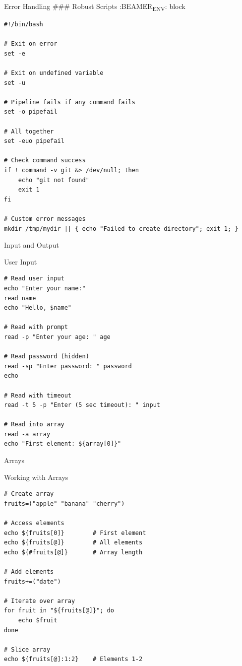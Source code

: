 \documentclass[presentation,aspectratio=1610]{beamer}
\begin{document}
\begin{frame}[label={sec:org83c1358},fragile]{Error Handling}
 \#\#\# Robust Scripts
:BEAMER\textsubscript{ENV}: block

\begin{verbatim}
#!/bin/bash

# Exit on error
set -e

# Exit on undefined variable
set -u

# Pipeline fails if any command fails
set -o pipefail

# All together
set -euo pipefail

# Check command success
if ! command -v git &> /dev/null; then
    echo "git not found"
    exit 1
fi

# Custom error messages
mkdir /tmp/mydir || { echo "Failed to create directory"; exit 1; }
\end{verbatim}
\end{frame}
\begin{frame}[label={sec:orgd1e7cc3},fragile]{Input and Output}
 \begin{block}{User Input}
\begin{verbatim}
# Read user input
echo "Enter your name:"
read name
echo "Hello, $name"

# Read with prompt
read -p "Enter your age: " age

# Read password (hidden)
read -sp "Enter password: " password
echo

# Read with timeout
read -t 5 -p "Enter (5 sec timeout): " input

# Read into array
read -a array
echo "First element: ${array[0]}"
\end{verbatim}
\end{block}
\end{frame}
\begin{frame}[label={sec:org3fc708f},fragile]{Arrays}
 \begin{block}{Working with Arrays}
\begin{verbatim}
# Create array
fruits=("apple" "banana" "cherry")

# Access elements
echo ${fruits[0]}        # First element
echo ${fruits[@]}        # All elements
echo ${#fruits[@]}       # Array length

# Add elements
fruits+=("date")

# Iterate over array
for fruit in "${fruits[@]}"; do
    echo $fruit
done

# Slice array
echo ${fruits[@]:1:2}    # Elements 1-2
\end{verbatim}
\end{block}
\end{frame}
\end{document}

